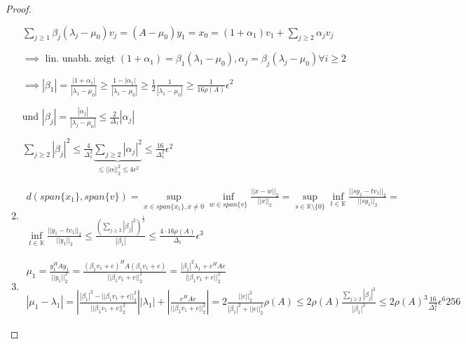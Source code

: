 \begin{proof}
\begin{enumerate}
		$\sum_{j\geq 1}\beta_j (\lambda_j - \mu_0) v_j = (A - \mu_0)y_1 = x_0 = (1+\alpha_1)v_1 + \sum_{j \geq 2}\alpha_j v_j$
		
		$\implies$ lin. unabh. zeigt $(1 + \alpha_1) = \beta_1(\lambda_1 - \mu_0), \alpha_j = \beta_j(\lambda_j - \mu_0) \forall i \geq 2$
		
		$\implies |\beta_1| = \frac{|1 + \alpha_1|}{|\lambda_1 - \mu_0|} \geq \frac{1 - |\alpha_1|}{|\lambda_1 - \mu_0|} \geq \frac{1}{2} \frac{1}{|\lambda_1 - \mu_0|} \geq \frac{1}{16\rho(A)} \epsilon^2$
		
		und $|\beta_j| = \frac{|\alpha_j|}{|\lambda_j - \mu_0|} \leq \frac{2}{\Delta_1} |\alpha_j|$
		
		$\sum_{j\geq 2}|\beta_j|^2 \leq \frac{4}{\Delta_1^2} \underbrace{\sum_{j\geq 2}|\alpha_j|^2}_{\leq ||\alpha||_2^2 \leq 4 \epsilon^2} \leq \frac{16}{\Delta_1^2}\epsilon^2$
		
		\item \begin{align*}
			d(span\{x_1\}, span\{v\}) = \sup_{x \in span\{x_1\}, x \neq 0} \inf_{w \in span\{v\}} \frac{||x-w||_2}{||x||_2} =
			\sup_{s\in \mathbb{K}\setminus\{0\}} \inf_{t \in \mathbb{K}} \frac{||sy_1 - tv_1||_2}{||sy_1||_2} =\\
			\inf_{t \in \mathbb{K}} \frac{||y_1 - tv_1||_2}{||y_1||_2} \leq
			\frac{\left(\sum_{j\geq 2} |\beta_j|^2\right)^{\frac{1}{2}}}{|\beta_1|} \leq
			\frac{4\cdot 16 \rho(A)}{\Delta_1} \epsilon^3
		\end{align*}
		
		\item \begin{align*}
			\mu_1 = \frac{y_1^HAy_1}{||y_1||_2^2} =
			\frac{(\beta_1v_1 + e)^HA(\beta_1v_1 + e)}{||\beta_1v_1 + e||_2^2} =
			\frac{|\beta_1|^2 \lambda_1 + e^HAe}{||\beta_1v_1 + e||_2^2}\\
			|\mu_1 - \lambda_1| = \left|\frac{|\beta_1|^2 - ||\beta_1v_1 + e||_2^2}{||\beta_1v_1 + e||_2^2}\right| |\lambda_1| + \left|\frac{e^HAe}{||\beta_1v_1 + e||_2^2}\right| = 
			2 \frac{||e||_2^2}{|\beta_1|^2 + ||e||_2^2} \rho(A) \leq
			2\rho(A) \frac{\sum_{j\geq 2}|\beta_j|^2}{|\beta_1|^2} \leq
			2 \rho(A)^3 \frac{16}{\Delta_1^2} \epsilon^6 256
		\end{align*}
	\end{enumerate}
\end{proof}

